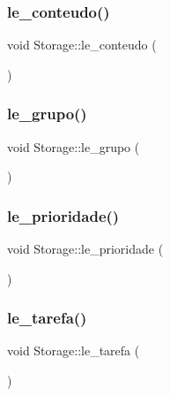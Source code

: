 \subsubsection{\texorpdfstring{le\+\_\+conteudo()}{le\_conteudo()}}
{\footnotesize\ttfamily void Storage\+::le\+\_\+conteudo (\begin{DoxyParamCaption}{ }\end{DoxyParamCaption})}

\mbox{\label{classStorage_a571f009d0dca33811883d381a70ccda5}} 
\subsubsection{\texorpdfstring{le\+\_\+grupo()}{le\_grupo()}}
{\footnotesize\ttfamily void Storage\+::le\+\_\+grupo (\begin{DoxyParamCaption}{ }\end{DoxyParamCaption})}

\mbox{\label{classStorage_aac1b536c28c1bd7a3bef1f0b8738f8d2}} 
\subsubsection{\texorpdfstring{le\+\_\+prioridade()}{le\_prioridade()}}
{\footnotesize\ttfamily void Storage\+::le\+\_\+prioridade (\begin{DoxyParamCaption}{ }\end{DoxyParamCaption})}

\mbox{\label{classStorage_a0b13d6c7e111f6bbeb4c6c03feb532c9}} 
\subsubsection{\texorpdfstring{le\+\_\+tarefa()}{le\_tarefa()}}
{\footnotesize\ttfamily void Storage\+::le\+\_\+tarefa (\begin{DoxyParamCaption}{ }\end{DoxyParamCaption})}

\mbox{\label{classStorage_a4d149db70dfa838a52ad53bb22555050}} 
